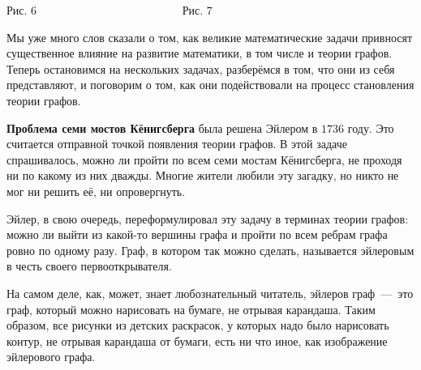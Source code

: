 \begin{example}
\begin{center}
\newline 
Рис. 6  \;\ \;\ \;\ \;\ \;\ \;\ \;\ \;\ \;\ \;\ \;\ \;\ \;\ \;\ \;\ \;\ \;\ \;\ \;\ \;\ \;\ \;\ \;\ \;\ \;\ Рис. $7$ \;\ \;\ \;\ \;\ \;\ \;\ 
\end{center}
\end{example}


	Мы уже много слов сказали о том, как великие математические задачи привносят существенное влияние на развитие математики, в том числе и теории графов. Теперь остановимся на нескольких задачах, разберёмся в том, что они из себя представляют, и поговорим о том, как они подействовали на процесс становления теории графов.

	\textbf{Проблема семи мостов Кёнигсберга} была решена Эйлером в $1736$ году. Это считается отправной точкой появления теории графов. В этой задаче спрашивалось, можно ли пройти по всем семи мостам Кёнигсберга, не проходя ни по какому из них дважды. Многие жители любили эту загадку, но никто не мог ни решить её, ни опровергнуть. 
	
	Эйлер, в свою очередь, переформулировал эту задачу в терминах теории графов: можно ли выйти из какой-то вершины графа и пройти по всем ребрам графа ровно по одному разу. Граф, в котором так можно сделать, называется эйлеровым в честь своего первооткрывателя. 

	На самом деле, как, может, знает любознательный читатель, эйлеров граф~---~это граф, который можно нарисовать на бумаге, не отрывая карандаша. Таким образом, все рисунки из детских раскрасок, у которых надо было нарисовать контур, не отрывая карандаша от бумаги, есть ни что иное, как изображение эйлерового графа. 

